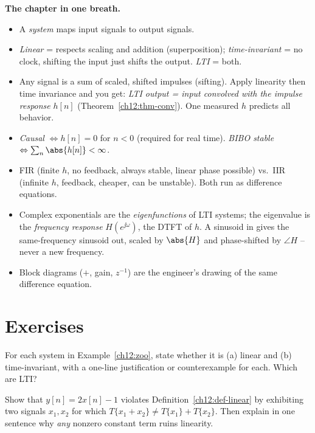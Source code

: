 \begin{recoverybox}
\textbf{The chapter in one breath.}
\begin{itemize}
  \item A \emph{system} maps input signals to output signals.
  \item \emph{Linear} = respects scaling and addition (superposition);
        \emph{time-invariant} = no clock, shifting the input just shifts the
        output. \emph{LTI} = both.
  \item Any signal is a sum of scaled, shifted impulses (sifting). Apply
        linearity then time invariance and you get: \emph{LTI output = input
        convolved with the impulse response} $h[n]$
        (Theorem~\ref{ch12:thm-conv}). One measured $h$ predicts all behavior.
  \item \emph{Causal} $\Leftrightarrow h[n]=0$ for $n<0$ (required for real time).
        \emph{BIBO stable} $\Leftrightarrow \sum_n\abs{h[n]}<\infty$.
  \item FIR (finite $h$, no feedback, always stable, linear phase possible) vs.\
        IIR (infinite $h$, feedback, cheaper, can be unstable). Both run as
        difference equations.
  \item Complex exponentials are the \emph{eigenfunctions} of LTI systems; the
        eigenvalue is the \emph{frequency response} $H(e^{\jj\omega})$, the DTFT
        of $h$. A sinusoid in gives the same-frequency sinusoid out, scaled by
        $\abs{H}$ and phase-shifted by $\angle H$ -- never a new frequency.
  \item Block diagrams ($+$, gain, $z^{-1}$) are the engineer's drawing of the
        same difference equation.
\end{itemize}
\end{recoverybox}

\section{Exercises}
\label{ch12:exercises}

\begin{exercise}
For each system in Example~\ref{ch12:zoo}, state whether it is (a) linear and
(b) time-invariant, with a one-line justification or counterexample for each.
Which are LTI?
\end{exercise}

\begin{exercise}
Show that $y[n]=2x[n]-1$ violates Definition~\ref{ch12:def-linear} by exhibiting
two signals $x_1,x_2$ for which $T\{x_1+x_2\}\ne T\{x_1\}+T\{x_2\}$. Then explain
in one sentence why \emph{any} nonzero constant term ruins linearity.
\end{exercise}

